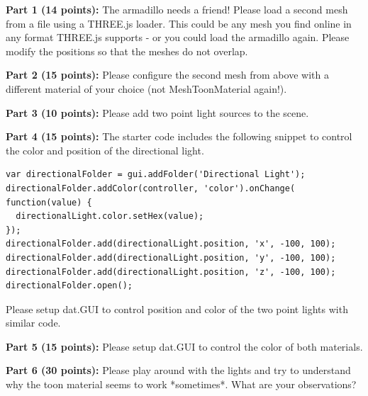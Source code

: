\documentclass[10pt,oneside,onecolumn,letterpaper]{article}
\begin{document}
\noindent\textbf{Part 1 (14 points):} The armadillo needs a friend! Please load a second mesh from a file using a THREE.js loader. This could be any mesh you find online in any format THREE.js supports - or you could load the armadillo again. Please modify the positions so that the meshes do not overlap.

\vspace{.5cm}

\noindent\textbf{Part 2 (15 points):} Please configure the second mesh from above with a different material of your choice (not MeshToonMaterial again!).

\vspace{.5cm}

\noindent\textbf{Part 3 (10 points):} Please add two point light sources to the scene.

\vspace{.5cm}

\noindent\textbf{Part 4 (15 points):} The starter code includes the following snippet to control the color and position of the directional light.

\begin{verbatim}
var directionalFolder = gui.addFolder('Directional Light');
directionalFolder.addColor(controller, 'color').onChange( function(value) {
  directionalLight.color.setHex(value); 
});
directionalFolder.add(directionalLight.position, 'x', -100, 100);
directionalFolder.add(directionalLight.position, 'y', -100, 100);
directionalFolder.add(directionalLight.position, 'z', -100, 100);
directionalFolder.open();   
\end{verbatim}

Please setup dat.GUI to control position and color of the two point lights with similar code.

\vspace{.5cm}
\newpage
\noindent\textbf{Part 5 (15 points):} Please setup dat.GUI to control the color of both materials.


\vspace{.5cm}
\noindent\textbf{Part 6 (30 points):} Please play around with the lights and try to understand why the toon material seems to work *sometimes*. What are your observations?

\vspace{.5cm}

\end{document}
